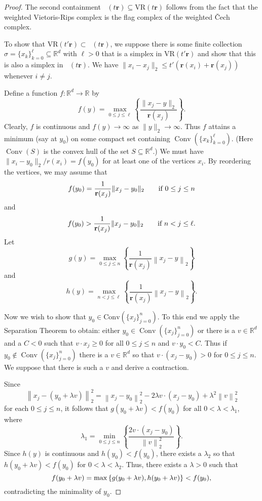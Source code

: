 \documentclass{amsart}
\newtheorem*{fibering lemma}{Fibering Lemma}
\newtheorem*{decomposition lemma}{Decomposition Lemma}
\newtheorem*{hurewicz theorem}{Hurewicz Theorem}
\theoremstyle{definition}
\newcommand{\RR}{\mathbb{R}}
\newcommand{\VR}{\mathrm{VR}}
\DeclareMathOperator{\Cech}{\check{C}ech}
\DeclareMathOperator{\Conv}{Conv}
\begin{document}
\begin{proof}
The second containment $\Cech(t \mathbf{r}) \subseteq \VR(t \mathbf{r})$ follows from the fact that the weighted Vietoris-Rips complex is the flag complex of the weighted \v{C}ech complex. 
        
To show that $\VR(t'\mathbf{r})\subset \Cech(t\mathbf{r})$, we suppose there is some finite collection $\sigma = \{x_k\}_{k=0}^\ell \subseteq \RR^d$ with $\ell >0$ that is a simplex in $\VR(t' \mathbf{r})$ and show that this is also a simplex in $\Cech(t \mathbf{r})$. We have $\|x_i-x_j\|_2 \le t' (\mathbf{r}(x_i) + \mathbf{r}(x_j))$ whenever $i \neq j$.

Define a function $f:\RR^d \to \RR$ by \[f(y) = \max_{0 \leq j \leq \ell} \left\{\frac{\|x_j - y\|_2}{\mathbf{r}(x_j)}\right\}.\] Clearly, $f$ is continuous and $f(y) \to \infty$ as $\|y\|_2 \to \infty$. Thus $f$ attains a minimum (say at $y_0$) on some compact set containing $\Conv(\{x_k\}_{k=0}^{\ell})$. (Here $\Conv(S)$ is the convex hull of the set $S \subseteq {\mathbb R}^d$.) We must have $\|x_i-y_0\|_2/ r(x_i) = f(y_0)$ for at least one of the vertices $x_i$. By reordering the vertices, we may assume that  \[f(y_0) = \frac{1}{\mathbf{r}(x_j)} \|x_j - y_0\|_2\qquad \hbox{if $0\le j\le n$}\] and \[f(y_0) > \frac{1}{\mathbf{r}(x_j)} \|x_j - y_0\|_2\qquad \hbox{if $n<j\le \ell$.}\] Let \[g(y) = \max_{0 \leq j \leq n} \left\{\frac{1}{\mathbf{r}(x_j)}\left\|x_j - y\right\|_2\right\}\] and \[h(y) = \max_{n < j \leq \ell} \left\{\frac{1}{\mathbf{r}(x_j)}\left\|x_j - y\right\|_2\right\}.\]
		
Now we wish to show that $y_0 \in \mathrm{Conv}(\{x_j\}_{j=0}^{n})$. To this end we apply the Separation Theorem \cite{Matousek} to obtain: either $y_0 \in \Conv(\{x_j\}_{j=0}^{n})$ or there is a $v \in \RR^d$ and a $C<0$ such that $v \cdot x_j \ge 0$ for all $0 \le j \le n$ and $v \cdot y_0 < C$. Thus if $y_0 \not \in \Conv(\{x_j\}_{j=0}^{n})$ there is a $v \in \RR^d$ so that $v \cdot (x_j - y_0) > 0$ for $0 \leq j \leq n$. We suppose that there is such a $v$ and derive a contraction.

Since \[\left\|x_j - (y_0 + \lambda v)\right\|_2^2 = \left\|x_j - y_0\right\|_2^2 - 2 \lambda v \cdot (x_j - y_0) + \lambda^2 \left\|v\right\|_2^2\] for each $0 \leq j \leq n$, it follows that $g(y_0 + \lambda v) < f(y_0)$ for all $0 < \lambda < \lambda_1$, where \[\lambda_1 = \min_{0 \leq j \leq n} \left\{\frac{2 v \cdot (x_j - y_0)}{\left\|v\right\|_2^2}\right\}.\] Since $h(y)$ is continuous and $h(y_0) < f(y_0)$, there exists a $\lambda_2$ so that $h(y_0 + \lambda v) < f(y_0)$ for $0 < \lambda < \lambda_2$. Thus, there exists a $\lambda > 0$ such that \[f(y_0 + \lambda v) = \max\left\{g(y_0 + \lambda v), h(y_0 + \lambda v)\right\} < f(y_0)\hbox{,}\] contradicting the minimality of $y_0$.


\end{proof}
\end{document}
